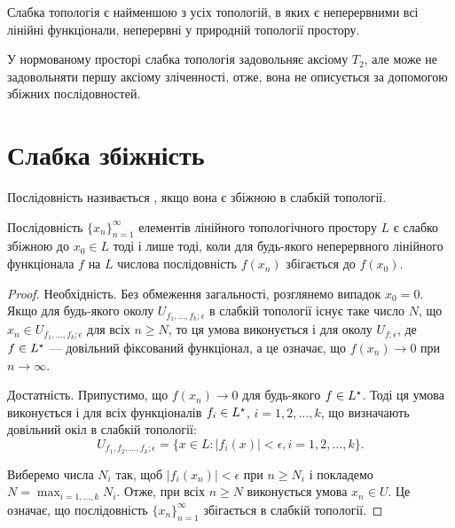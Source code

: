 \begin{remark}
Слабка топологія є найменшою з усіх
топологій, в яких є неперервними всі лінійні функціонали,
неперервні у природній топології простору.
\end{remark}

\begin{remark}
У нормованому просторі слабка
топологія задовольняє аксіому $T_2$, але може не задовольняти
першу аксіому зліченності, отже, вона не описується за
допомогою збіжних послідовностей.
\end{remark}

\section{Слабка збіжність}

\begin{definition}
Послідовність 
називається ,
якщо вона є збіжною в слабкій топології.
\end{definition}

\begin{lemma}
Послідовність $\{x_n\}_{n = 1}^\infty$
елементів лінійного топологічного простору $L$ є слабко збіжною до $x_0 \in L$ тоді
і лише тоді, коли для будь-якого неперервного лінійного
функціонала $f$ на $L$ числова послідовність $f(x_n)$
збігається до $f(x_0)$.
\end{lemma}

\begin{proof}
Необхідність. Без обмеження загальності,
розглянемо випадок $x_0 = 0$. Якщо для будь-якого околу
$U_{f_1, \dots, f_k; \epsilon}$ в слабкій топології існує таке число $N$, що
$x_n \in U_{f_1, \dots, f_k; \epsilon}$ для всіх $n \ge N$, то ця умова виконується і для
околу $U_{f;\epsilon}$, де $f \in L^\star$ --- довільний фіксований функціонал, а
це означає, що $f(x_n) \to 0$ при $n \to \infty$.

Достатність. Припустимо, що $f(x_n) \to 0$ для будь-якого
$f \in L^\star$. Тоді ця умова виконується і для всіх функціоналів
$f_i \in L^\star$, $i = 1, 2, \dots, k$, що визначають довільний окіл в слабкій
топології:
\begin{equation*}
    U_{f_1, f_2, \dots, f_k; \epsilon} =
    \{ x \in L: |f_i(x)| < \epsilon, i = 1, 2, \dots, k \}.
\end{equation*}

Виберемо числа $N_i$ так, щоб $|f_i(x_n)| < \epsilon$ при $n \ge N_i$ і
покладемо $N = \max_{i = 1, \dots, k} N_i$. Отже, при всіх $n \ge N$ виконується
умова $x_n \in U$. Це означає, що послідовність $\{x_n\}_{n = 1}^\infty$
збігається в слабкій топології. 
\end{proof}

